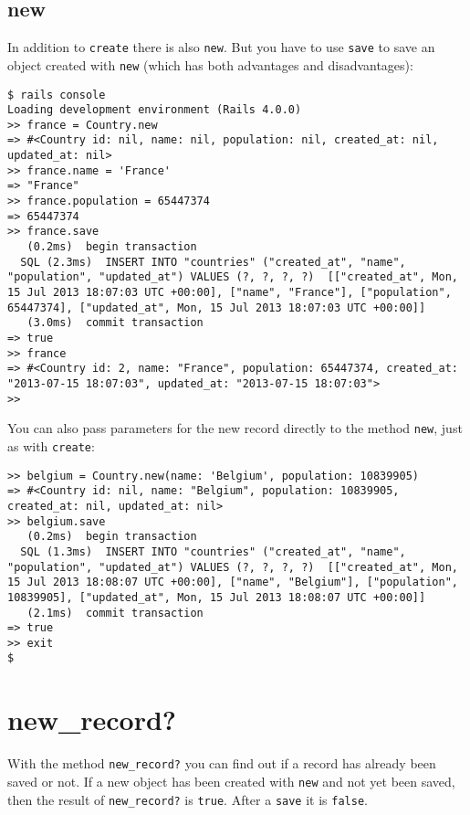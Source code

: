\documentclass[a4paper]{book}
\newcommand{\chap}[1]{\newpage\thispagestyle{empty}\chapter{#1}\label{chap:\thechapter}}
\begin{document}
\section{new}\label{new}

In addition to \texttt{create} there is also \texttt{new}. But you have to use \texttt{save} to save an object created with \texttt{new} (which has both advantages and disadvantages):

\begin{shaded}\begin{verbatim}
$ rails console
Loading development environment (Rails 4.0.0)
>> france = Country.new
=> #<Country id: nil, name: nil, population: nil, created_at: nil, updated_at: nil>
>> france.name = 'France'
=> "France"
>> france.population = 65447374
=> 65447374
>> france.save
   (0.2ms)  begin transaction
  SQL (2.3ms)  INSERT INTO "countries" ("created_at", "name", "population", "updated_at") VALUES (?, ?, ?, ?)  [["created_at", Mon, 15 Jul 2013 18:07:03 UTC +00:00], ["name", "France"], ["population", 65447374], ["updated_at", Mon, 15 Jul 2013 18:07:03 UTC +00:00]]
   (3.0ms)  commit transaction
=> true
>> france
=> #<Country id: 2, name: "France", population: 65447374, created_at: "2013-07-15 18:07:03", updated_at: "2013-07-15 18:07:03">
>>
\end{verbatim}\end{shaded}

You can also pass parameters for the new record directly to the method \texttt{new}, just as with \texttt{create}:

\begin{shaded}\begin{verbatim}
>> belgium = Country.new(name: 'Belgium', population: 10839905)
=> #<Country id: nil, name: "Belgium", population: 10839905, created_at: nil, updated_at: nil>
>> belgium.save
   (0.2ms)  begin transaction
  SQL (1.3ms)  INSERT INTO "countries" ("created_at", "name", "population", "updated_at") VALUES (?, ?, ?, ?)  [["created_at", Mon, 15 Jul 2013 18:08:07 UTC +00:00], ["name", "Belgium"], ["population", 10839905], ["updated_at", Mon, 15 Jul 2013 18:08:07 UTC +00:00]]
   (2.1ms)  commit transaction
=> true
>> exit
$
\end{verbatim}\end{shaded}

\chap{new\_record?}\label{newux5frecord}

With the method \texttt{new\_record?} you can find out if a record has already been saved or not. If a new object has been created with \texttt{new} and not yet been saved, then the result of \texttt{new\_record?} is \texttt{true}. After a \texttt{save} it is \texttt{false}.
\end{document}
